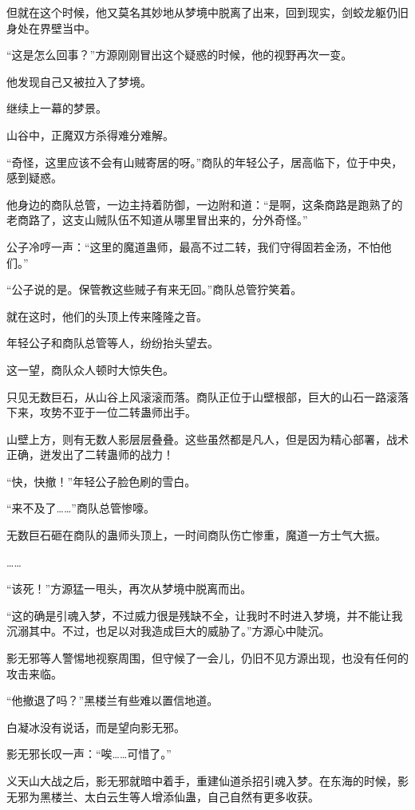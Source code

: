 \begin{this_body}
但就在这个时候，他又莫名其妙地从梦境中脱离了出来，回到现实，剑蛟龙躯仍旧身处在界壁当中。

“这是怎么回事？”方源刚刚冒出这个疑惑的时候，他的视野再次一变。

他发现自己又被拉入了梦境。

继续上一幕的梦景。

山谷中，正魔双方杀得难分难解。

“奇怪，这里应该不会有山贼寄居的呀。”商队的年轻公子，居高临下，位于中央，感到疑惑。

他身边的商队总管，一边主持着防御，一边附和道：“是啊，这条商路是跑熟了的老商路了，这支山贼队伍不知道从哪里冒出来的，分外奇怪。”

公子冷哼一声：“这里的魔道蛊师，最高不过二转，我们守得固若金汤，不怕他们。”

“公子说的是。保管教这些贼子有来无回。”商队总管狞笑着。

就在这时，他们的头顶上传来隆隆之音。

年轻公子和商队总管等人，纷纷抬头望去。

这一望，商队众人顿时大惊失色。

只见无数巨石，从山谷上风滚滚而落。商队正位于山壁根部，巨大的山石一路滚落下来，攻势不亚于一位二转蛊师出手。

山壁上方，则有无数人影层层叠叠。这些虽然都是凡人，但是因为精心部署，战术正确，迸发出了二转蛊师的战力！

“快，快撤！”年轻公子脸色刷的雪白。

“来不及了……”商队总管惨嚎。

无数巨石砸在商队的蛊师头顶上，一时间商队伤亡惨重，魔道一方士气大振。

……

“该死！”方源猛一甩头，再次从梦境中脱离而出。

“这的确是引魂入梦，不过威力很是残缺不全，让我时不时进入梦境，并不能让我沉溺其中。不过，也足以对我造成巨大的威胁了。”方源心中陡沉。

影无邪等人警惕地视察周围，但守候了一会儿，仍旧不见方源出现，也没有任何的攻击来临。

“他撤退了吗？”黑楼兰有些难以置信地道。

白凝冰没有说话，而是望向影无邪。

影无邪长叹一声：“唉……可惜了。”

义天山大战之后，影无邪就暗中着手，重建仙道杀招引魂入梦。在东海的时候，影无邪为黑楼兰、太白云生等人增添仙蛊，自己自然有更多收获。


\end{this_body}

